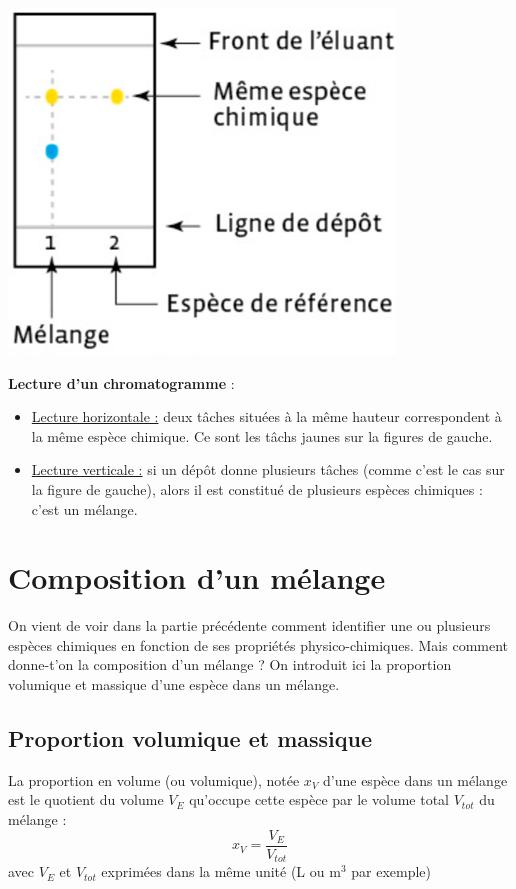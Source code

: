 \begin{minipage}[c]{0.4\textwidth}
    \includegraphics{Images/CCM.png}
\end{minipage}
\begin{minipage}[c]{0.6\textwidth}
    \textbf{Lecture d'un chromatogramme} :
    \begin{itemize}
        \item \underline{Lecture horizontale :} deux tâches situées à la même hauteur correspondent à la même espèce chimique. Ce sont les tâchs jaunes sur la figures de gauche.
        \item  \underline{Lecture verticale :} si un dépôt donne plusieurs tâches (comme c'est le cas sur la figure de gauche), alors il est constitué de plusieurs espèces chimiques : c’est un mélange.
    \end{itemize}
\end{minipage}

\section{Composition d'un mélange}
On vient de voir dans la partie précédente comment identifier une ou plusieurs espèces chimiques en fonction de ses propriétés physico-chimiques. Mais comment donne-t'on la composition d'un mélange ? On introduit ici la proportion volumique et massique d'une espèce dans un mélange.

\subsection{Proportion volumique et massique}

\begin{tcolorbox}[colback=green!5!white,colframe=green!75!black,title=\textbf{Proportion volumique}]
La proportion en volume (ou volumique), notée $x_V$ d'une espèce dans un mélange est le quotient du volume $V_{E}$ qu'occupe cette espèce par le volume total $V_{tot}$ du mélange :
\begin{equation*}
    x_V=\frac{V_E}{V_{tot}}
\end{equation*}
avec $V_{E}$ et $V_{tot}$ exprimées dans la même unité (L ou m$^3$ par exemple)
\end{tcolorbox}


